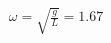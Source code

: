 \documentclass[preview]{standalone}
\begin{document}
\begin{align*}
\omega = \sqrt{\frac{g}{L}} = 1.67
\end{align*}
\end{document}

